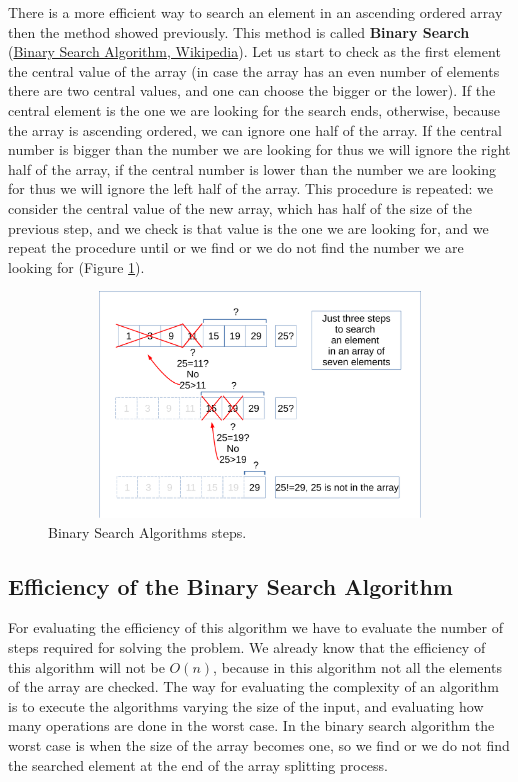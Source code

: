 There is a more efficient way to search an element in an ascending ordered array then the method showed previously. This method is called \textbf{Binary Search} \cite{wikibinarysearch} (\href{https://en.wikipedia.org/wiki/Binary_search_algorithm}{Binary Search Algorithm, Wikipedia}).
Let us start to check as the first element the central value of the array (in case the array has an even number of elements there are two central values, and one can choose the bigger or the lower). If the central element is the one we are looking for the search ends, otherwise, because the array is ascending ordered, we can ignore one half of the array. If the central number is bigger than the number we are looking for thus we will ignore the right half of the array, if the central number is lower than the number we are looking for thus we will ignore the left half of the array. This procedure is repeated: we consider the central value of the new array, which has half of the size of the previous step, and we check is that value is the one we are looking for, and we repeat the procedure until or we find or we do not find the number we are looking for (Figure \ref{sorting_2}). 

\begin{figure}[hb]
	\includegraphics[width=14cm,height=6cm]{chapters/searchandsorting/images/sorting_2.pdf}
	\caption[]{Binary Search Algorithms steps.}
	\label{sorting_2}
\end{figure}

\subsection{Efficiency of the Binary Search Algorithm}
For evaluating the efficiency of this algorithm we have to evaluate the number of steps required for solving the problem. We already know that the efficiency of this algorithm will not be \(O(n)\), because in this algorithm not all the elements of the array are checked. The way for evaluating the complexity of an algorithm is to execute the algorithms varying the size of the input, and evaluating how many operations are done in the worst case. In the binary search algorithm the worst case is when the size of the array becomes one, so we find or we do not find the searched element at the end of the array splitting process.

